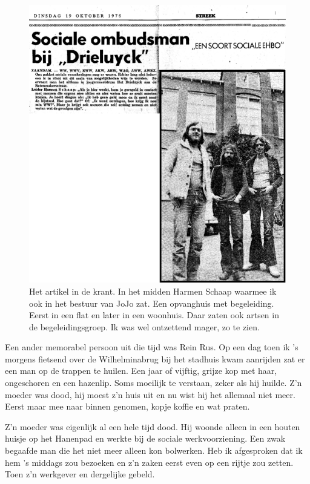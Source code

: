 \documentclass[10pt,twoside, openright]{memoir}
\begin{document}
\begin{figure}
\includegraphics[width=\textwidth]{img/ch42/krant}
\caption*{\footnotesize Het artikel in de krant. In het midden Harmen Schaap waarmee ik ook in het bestuur van JoJo zat. Een opvanghuis met begeleiding. Eerst in een flat en later in een woonhuis. Daar zaten ook artsen in de begeleidingsgroep. Ik was wel ontzettend mager, zo te zien.}
\end{figure}

Een ander memorabel persoon uit die tijd was Rein Rus. Op een dag toen ik ’s morgens fietsend over de Wilhelminabrug bij het stadhuis kwam aanrijden zat er een man op de trappen te huilen. Een jaar of vijftig, grijze kop met haar, ongeschoren en een hazenlip. Soms moeilijk te verstaan, zeker als hij huilde. Z’n moeder was dood, hij moest z’n huis uit en nu wist hij het allemaal niet meer. Eerst maar mee naar binnen genomen, kopje koffie en wat praten. 

Z’n moeder was eigenlijk al een hele tijd dood. Hij woonde alleen in een houten huisje op het Hanenpad en werkte bij de sociale werkvoorziening. Een zwak begaafde man die het niet meer alleen kon bolwerken. Heb ik afgesproken dat ik hem ’s middags zou bezoeken en z’n zaken eerst even op een rijtje zou zetten. Toen z'n werkgever en dergelijke gebeld. 
\end{document}
